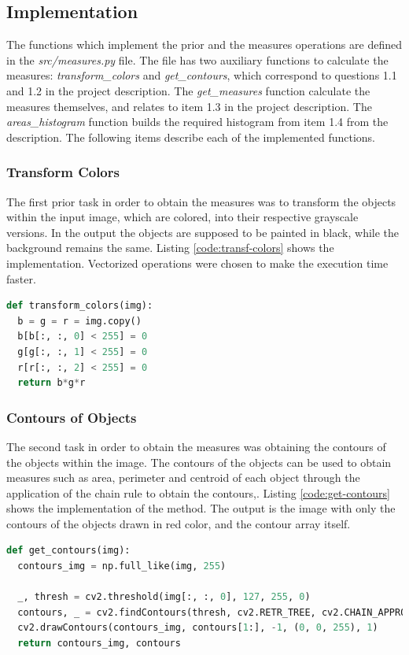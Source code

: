\documentclass[]{IEEEtran}
\begin{document}
\subsection{Implementation}
The functions which implement the prior and the measures operations are defined in the \textit{src/measures.py} file. The file has two auxiliary functions to calculate the measures: \textit{transform\_colors} and \textit{get\_contours}, which correspond to questions 1.1 and 1.2 in the project description. The \textit{get\_measures} function calculate the measures themselves, and relates to item 1.3 in the project description. The \textit{areas\_histogram} function builds the required histogram from item 1.4 from the description. The following items describe each of the implemented functions.

\subsubsection{Transform Colors}
The first prior task in order to obtain the measures was to transform the objects within the input image, which are colored, into their respective grayscale versions. In the output the objects are supposed to be painted in black, while the background remains the same. Listing \ref{code:transf-colors} shows the implementation. Vectorized operations were chosen to make the execution time faster.

\begin{lstlisting}[language=Python, caption={Transform Colors Implementation}, label={code:transf-colors}]
def transform_colors(img):
  b = g = r = img.copy()
  b[b[:, :, 0] < 255] = 0
  g[g[:, :, 1] < 255] = 0
  r[r[:, :, 2] < 255] = 0
  return b*g*r
\end{lstlisting}

\subsubsection{Contours of Objects}
The second task in order to obtain the measures was obtaining the contours of the objects within the image. The contours of the objects can be used to obtain measures such as area, perimeter and centroid of each object through the application of the chain rule to obtain the contours\cite{CLASS:1},\cite{CLASS:2}. Listing \ref{code:get-contours} shows the implementation of the method. The output is the image with only the contours of the objects drawn in red color, and the contour array itself. 

\begin{lstlisting}[language=Python, caption={Get Contours Implementation}, label={code:get-contours}]
def get_contours(img):
  contours_img = np.full_like(img, 255)

  _, thresh = cv2.threshold(img[:, :, 0], 127, 255, 0)
  contours, _ = cv2.findContours(thresh, cv2.RETR_TREE, cv2.CHAIN_APPROX_NONE)
  cv2.drawContours(contours_img, contours[1:], -1, (0, 0, 255), 1)
  return contours_img, contours
\end{lstlisting}
\end{document}
